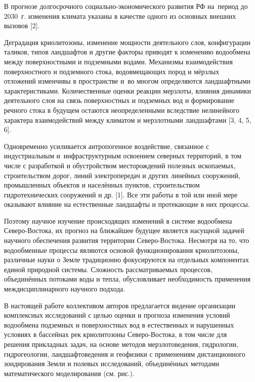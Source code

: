  

\makeProcTitle
{}

В прогнозе долгосрочного социально-экономического развития РФ на~период до 2030~г. изменения климата указаны в качестве одного из основных внешних вызовов [2].

Деградация криолитозоны, изменение мощности деятельного слоя, конфигурации таликов, типов ландшафтов и другие факторы приводят к изменению водообмена между поверхностными и подземными водами. Механизмы взаимодействия поверхностного и подземного стока, водовмещающих пород и мёрзлых отложений изменчивы в пространстве и~во многом определяются ландшафтными характеристиками. Количественные оценки реакции мерзлоты, влияния динамики деятельного слоя на связь поверхностных и подземных вод и формирование речного стока в будущем остаются неопределенными вследствие нелинейного характера взаимодействий между климатом и мерзлотными ландшафтами [3, 4, 5, 6].

Одновременно усиливается антропогенное воздействие, связанное с индустриальным и~инфраструктурным освоением северных территорий, в том числе с разработкой и обустройством месторождений полезных ископаемых, строительством дорог, линий электропередач и других линейных сооружений, промышленных объектов и населённых пунктов, строительством гидротехнических сооружений и др. [1]. Все эти работы в той или иной мере оказывают влияние на естественные ландшафты и протекающие в них процессы.

Поэтому научное изучение происходящих изменений в системе водообмена Северо-Востока, их прогноз на ближайшее будущее является насущной задачей научного обеспечения развития территории Северо-Востока. Несмотря на то, что водообменные процессы являются основой функционирования криолитозоны, различные науки о Земле традиционно фокусируются на отдельных компонентах единой природной системы. Сложность рассматриваемых процессов, объединённых потоками воды и тепла, обусловливает необходимость применения междисциплинарного научного подхода.

В настоящей работе коллективом авторов предлагается видение организации комплексных исследований с целью оценки и прогноза изменения условий водообмена подземных и поверхностных вод в естественных и нарушенных условиях в бассейнах рек криолитозоны Северо-Востока, в том числе для решения прикладных задач, на основе методов мерзлотоведения, гидрологии, гидрогеологии, ландшафтоведения и геофизики с применениям дистанционного зондирования Земли и полевых исследований, объединённых методами математического моделирования (см. рис.).

